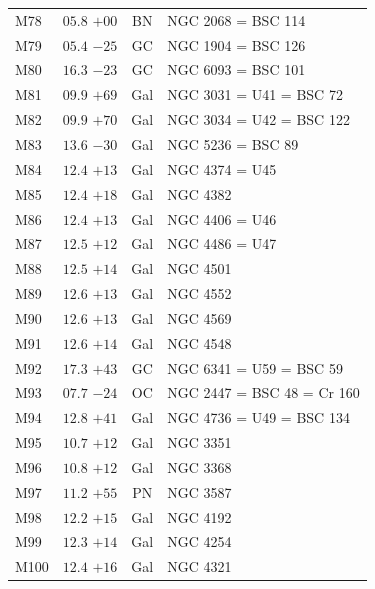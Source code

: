 \begin{table}[t]
\begin{tabularx}{\linewidth}{lccX}
M78  &$05.8$ $+00$&BN &NGC 2068 = BSC 114\\
M79  &$05.4$ $-25$&GC &NGC 1904 = BSC 126\\
M80  &$16.3$ $-23$&GC &NGC 6093 = BSC 101\\
M81  &$09.9$ $+69$&Gal&NGC 3031 = U41 = BSC 72\\
M82  &$09.9$ $+70$&Gal&NGC 3034 = U42 = BSC 122\\
M83  &$13.6$ $-30$&Gal&NGC 5236 = BSC 89\\
M84  &$12.4$ $+13$&Gal&NGC 4374 = U45\\
M85  &$12.4$ $+18$&Gal&NGC 4382\\
M86  &$12.4$ $+13$&Gal&NGC 4406 = U46\\
M87  &$12.5$ $+12$&Gal&NGC 4486 = U47\\
M88  &$12.5$ $+14$&Gal&NGC 4501\\
M89  &$12.6$ $+13$&Gal&NGC 4552\\
M90  &$12.6$ $+13$&Gal&NGC 4569\\
M91  &$12.6$ $+14$&Gal&NGC 4548\\
M92  &$17.3$ $+43$&GC &NGC 6341 = U59 = BSC 59\\
M93  &$07.7$ $-24$&OC &NGC 2447 = BSC 48 = Cr 160\\
M94  &$12.8$ $+41$&Gal&NGC 4736 = U49 = BSC 134\\
M95  &$10.7$ $+12$&Gal&NGC 3351\\
M96  &$10.8$ $+12$&Gal&NGC 3368\\
M97  &$11.2$ $+55$&PN &NGC 3587\\
M98  &$12.2$ $+15$&Gal&NGC 4192\\
M99  &$12.3$ $+14$&Gal&NGC 4254\\
M100 &$12.4$ $+16$&Gal&NGC 4321\\

        \hline
    \end{tabularx}
\end{table}
\clearpage


